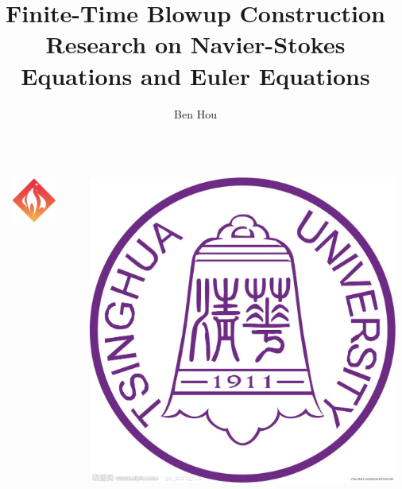 \documentclass[final]{beamer}
\title{%
  Finite-Time Blowup Construction Research on Navier-Stokes Equations and Euler Equations
}
\author{%
  Ben Hou\inst{1}%
}
\institute{%
  \inst{1}\utfprname, Beijing, China%
  \par e-mail: \email[1]{hhd16@mails.tsinghua.edu.cn}%
}
\date{}%
\begin{document}
\begin{frame}[t, fragile = singleslide]{}

\begin{columns}[t]%

\begin{column}{0.02\textwidth}
\end{column}

\begin{column}{0.18\textwidth}
\flushleft
\includegraphics[width = 0.8\columnwidth]{./Logos/logo-event}%
\end{column}

\begin{column}{0.6\textwidth}
\titlepage
\end{column}

\begin{column}{0.18\textwidth}
\flushright
\includegraphics[width = 0.8\columnwidth]{./Logos/logo-tsinghua}%
\end{column}


\end{columns}
\end{frame}
\end{document}
